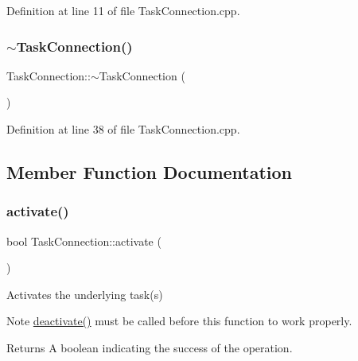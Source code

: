Definition at line 11 of file Task\+Connection.\+cpp.

\hypertarget{classocra__recipes_1_1TaskConnection_aa2a733dfaa80f32fa95f45c2d98f6106}{}\label{classocra__recipes_1_1TaskConnection_aa2a733dfaa80f32fa95f45c2d98f6106} 
\subsubsection{\texorpdfstring{$\sim$\+Task\+Connection()}{~TaskConnection()}}
{\footnotesize\ttfamily Task\+Connection\+::$\sim$\+Task\+Connection (\begin{DoxyParamCaption}{ }\end{DoxyParamCaption})\hspace{0.3cm}{\ttfamily [virtual]}}



Definition at line 38 of file Task\+Connection.\+cpp.



\subsection{Member Function Documentation}
\hypertarget{classocra__recipes_1_1TaskConnection_a64c0f6623daace3ac9030ec620ed98a2}{}\label{classocra__recipes_1_1TaskConnection_a64c0f6623daace3ac9030ec620ed98a2} 
\subsubsection{\texorpdfstring{activate()}{activate()}}
{\footnotesize\ttfamily bool Task\+Connection\+::activate (\begin{DoxyParamCaption}{ }\end{DoxyParamCaption})}

Activates the underlying task(s) \begin{DoxyNote}{Note}
{\ttfamily \hyperlink{classocra__recipes_1_1TaskConnection_a8488250380b7fd9598f3246ec6111d6a}{deactivate()}} must be called before this function to work properly.
\end{DoxyNote}
\begin{DoxyReturn}{Returns}
A boolean indicating the success of the operation. 
\end{DoxyReturn}


